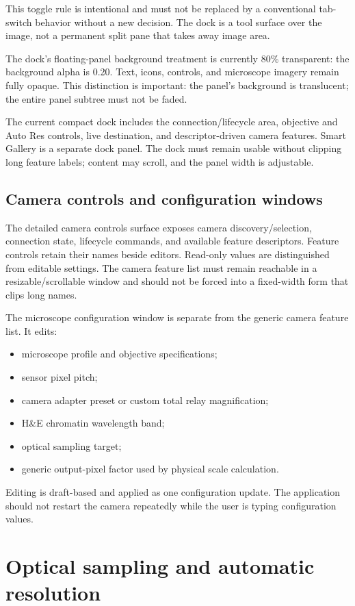 \documentclass[11pt,a4paper,oneside]{article}
\begin{document}
This toggle rule is intentional and must not be replaced by a conventional tab-switch behavior without a new decision. The dock is a tool surface over the image, not a permanent split pane that takes away image area.

The dock's floating-panel background treatment is currently 80\% transparent: the background alpha is 0.20. Text, icons, controls, and microscope imagery remain fully opaque. This distinction is important: the panel's background is translucent; the entire panel subtree must not be faded.

The current compact dock includes the connection/lifecycle area, objective and Auto Res controls, live destination, and descriptor-driven camera features. Smart Gallery is a separate dock panel. The dock must remain usable without clipping long feature labels; content may scroll, and the panel width is adjustable.

\subsection{Camera controls and configuration windows}
The detailed camera controls surface exposes camera discovery/selection, connection state, lifecycle commands, and available feature descriptors. Feature controls retain their names beside editors. Read-only values are distinguished from editable settings. The camera feature list must remain reachable in a resizable/scrollable window and should not be forced into a fixed-width form that clips long names.

The microscope configuration window is separate from the generic camera feature list. It edits:
\begin{itemize}
  \item microscope profile and objective specifications;
  \item sensor pixel pitch;
  \item camera adapter preset or custom total relay magnification;
  \item H\&E chromatin wavelength band;
  \item optical sampling target;
  \item generic output-pixel factor used by physical scale calculation.
\end{itemize}
Editing is draft-based and applied as one configuration update. The application should not restart the camera repeatedly while the user is typing configuration values.

\section{Optical sampling and automatic resolution}
\end{document}
